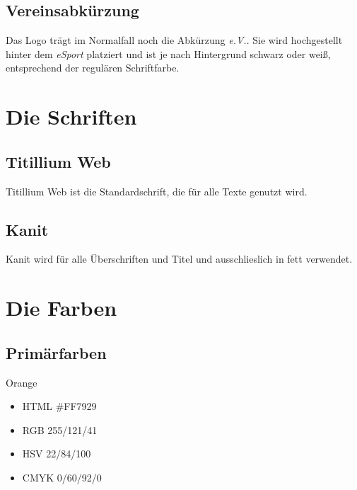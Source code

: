 \documentclass{article}
\begin{document}
\subsection{Vereinsabkürzung}

Das Logo trägt im Normalfall noch die Abkürzung \emph{e.V.}.
Sie wird hochgestellt hinter dem \emph{eSport} platziert und ist je nach Hintergrund schwarz oder weiß, entsprechend der regulären Schriftfarbe. %


\cleardoublepage
\section{Die Schriften}

\subsection{Titillium Web}
\begin{samepage}
Titillium Web ist die Standardschrift, die für alle Texte genutzt wird.

\end{samepage}

\subsection{Kanit}
\begin{samepage}
Kanit wird für alle Überschriften und Titel und ausschlieslich in fett verwendet.

\end{samepage}

\cleardoublepage
\section{Die Farben}

\subsection{Primärfarben}
\begin{samepage}
\cfield[LESOrange]
Orange
\begin{itemize}
\item HTML \#FF7929
\item RGB 255/121/41
\item HSV 22/84/100
\item CMYK 0/60/92/0
\end{itemize}
\end{samepage}
\end{document}
